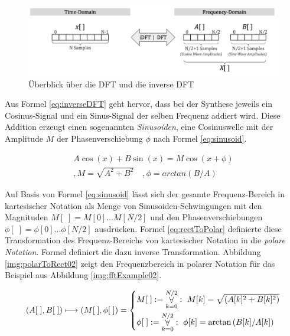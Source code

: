 \begin{figure}[h]
	\centering
	\includegraphics[width=1\textwidth]{bilder/dftOverview04.png}
	\caption{Überblick über die DFT und die inverse DFT}
	\label{img:dtOverview}
\end{figure}

Aus Formel \ref{eq:inverseDFT} geht hervor, dass bei der Synthese jeweils ein Cosinus-Signal und ein Sinus-Signal der selben Frequenz addiert wird. Diese Addition erzeugt einen sogenannten \emph{Sinusoiden}, eine Cosinuswelle mit der Amplitude $M$ der Phasenverschiebung $\phi$ nach Formel \ref{eq:sinusoid}.\cite[S. 162]{dspGuide}

\begin{equation}
\begin{split}
A \cos(x) + B \sin(x) = M \cos(x + \phi) \\
,M = \sqrt{A^2 + B^2} \quad, \phi = arctan(B/A)
\end{split}
\label{eq:sinusoid}
\end{equation}

Auf Basis von Formel \ref{eq:sinusoid} lässt sich der gesamte Frequenz-Bereich in kartesischer Notation als Menge von Sinusoiden-Schwingungen mit den Magnituden $M[\;] = M[0] \ldots M[N/2]$ und den Phasenverschiebungen $\phi[\;] = \phi[0] \ldots \phi[N/2]$ ausdrücken. Formel \ref{eq:rectToPolar} definierte diese Transformation des Frequenz-Bereichs von kartesischer Notation in die \emph{polare Notation}. Formel \label{eq:polarToRect} definiert die dazu inverse Transformation. \cite[S. 162]{dspGuide} Abbildung \ref{img:polarToRect02} zeigt den Frequenzbereich in polarer Notation für das Beispiel aus  Abbildung \ref{img:fftExample02}.

\begin{equation}
(A[\;], B[\;]) \longmapsto (M[\;], \phi[\;])  = 
\begin{dcases}
M[\;] := \mathop{\forall}_{k = 0}^{N/2} :\ M[k] = \sqrt{(A[k]^2 + B[k]^2 ) }   \\
 \phi[\;]  := \mathop{\forall}_{k = 0}^{N/2} :\ \phi[k]= \arctan{(B[k] / A[k]) }
\end{dcases}
\label{eq:rectToPolar}
\end{equation}

